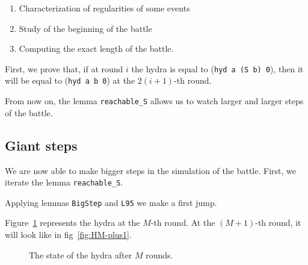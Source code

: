 \begin{enumerate}
\item  Characterization of regularities of some events
\item Study of the beginning of the battle
\item Computing the exact length of the battle.
\end{enumerate}

First, we prove that, if at round $i$ the hydra is equal to
(\texttt{hyd a (S b) 0}), then it will be equal to (\texttt{hyd a b 0}) at the $2(i+1)$-th round.

\vspace{4pt}




From now on, the lemma \texttt{reachable\_S} allows us to watch larger and larger steps of 
the battle.







\subsection{Giant steps}

We are now able to make bigger steps in the simulation of the battle.
First, we iterate the lemma \texttt{reachable\_S}.


\vspace{4pt}



\vspace{4pt}

Applying lemmas \texttt{BigStep} and \texttt{L95} we make a first jump.

\vspace{4pt}





Figure~\ref{fig:HM}  represents the hydra at the $M$-th round.
At the $(M+1)$-th round, it will look like in fig~\ref{fig:HM-plus1}.





\begin{figure}[htb]
\centering
{}
\caption{\label{fig:HM}}
The state of the hydra after $M$ rounds.

\end{figure}


